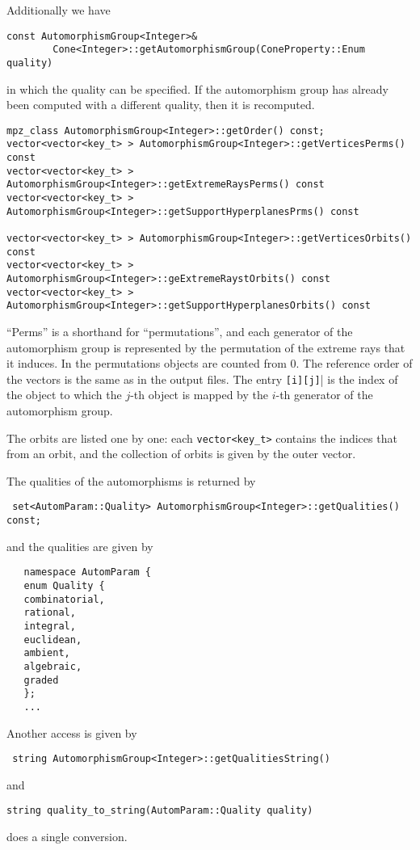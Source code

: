 \documentclass[12pt,a4paper]{scrartcl}
\theoremstyle{definition}
\begin{document}
\begin{small}
Additionally we have
\begin{Verbatim}
const AutomorphismGroup<Integer>& 
		Cone<Integer>::getAutomorphismGroup(ConeProperty::Enum quality)
\end{Verbatim}
in which the quality can be specified. If the automorphism group has already been computed with a different quality, then it is recomputed.


\begin{Verbatim}
mpz_class AutomorphismGroup<Integer>::getOrder() const;
vector<vector<key_t> > AutomorphismGroup<Integer>::getVerticesPerms() const
vector<vector<key_t> > AutomorphismGroup<Integer>::getExtremeRaysPerms() const
vector<vector<key_t> > AutomorphismGroup<Integer>::getSupportHyperplanesPrms() const

vector<vector<key_t> > AutomorphismGroup<Integer>::getVerticesOrbits() const
vector<vector<key_t> > AutomorphismGroup<Integer>::geExtremeRaystOrbits() const
vector<vector<key_t> > AutomorphismGroup<Integer>::getSupportHyperplanesOrbits() const
 \end{Verbatim}
 
 ``Perms'' is a shorthand for ``permutations'', and each generator of the automorphism group is represented by the permutation of the extreme rays that it induces.   In the permutations objects are counted from $0$. The reference order of the vectors is the same as in the output files. The entry \verb|[i][j]|| is the index of the object to which the $j$-th object is mapped by the $i$-th generator of the automorphism group.
 
 The orbits are listed one by one: each \verb|vector<key_t>| contains the indices that from an orbit, and the collection of orbits is given by the outer vector.
  
  The qualities of the automorphisms is returned by  
  \begin{Verbatim}
 set<AutomParam::Quality> AutomorphismGroup<Integer>::getQualities() const;
   \end{Verbatim}
   and the qualities are given by   
   \begin{Verbatim} 
   namespace AutomParam {
   enum Quality {    
   combinatorial,
   rational,
   integral,
   euclidean,
   ambient,
   algebraic,
   graded
   };
   ...
\end{Verbatim}
  Another access is given by
\begin{Verbatim}
 string AutomorphismGroup<Integer>::getQualitiesString()
 \end{Verbatim}
 and 
\begin{Verbatim}
string quality_to_string(AutomParam::Quality quality)
\end{Verbatim}
does a single conversion.


\end{small}
\end{document}
